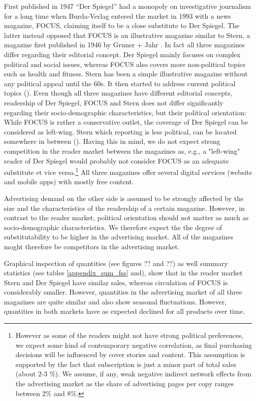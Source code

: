 \documentclass[12pt,a4paper]{scrreprt}
\begin{document}
First published in 1947 ``Der Spiegel'' had a monopoly on investigative journalism for a long time when Burda-Verlag entered the market in 1993 with a news magazine, FOCUS, claiming itself to be a close substitute to Der Spiegel. The latter instead opposed that FOCUS is an illustrative magazine similar to Stern, a magazine first published in 1946 by Gruner + Jahr \cite{kaltenhaeuser_abstimmung_2005}. In fact all three magazines differ regarding their editorial concept. Der Spiegel mainly focuses on complex political and social issues, whereas FOCUS also covers more non-political topics such as health and fitness. Stern has been a simple illustrative magazine without any political appeal until the 60s. It then started to address current political topics (\cite{vogel_populaere_1998}). Even though all three magazines have different editorial concepts, readership of Der Spiegel, FOCUS and Stern does not differ significantly regarding their socio-demographic characteristics, but their political orientation: While FOCUS is rather a conservative outlet, the coverage of Der Spiegel can be considered as left-wing. Stern which reporting is less political, can be located somewhere in between (\cite{kaltenhaeuser_abstimmung_2005}). Having this in mind, we do not expect strong competition in the reader market between the magazines as, e.g., a "left-wing" reader of Der Spiegel would probably not consider FOCUS as an adequate substitute et vice versa.\footnote{However as some of the readers might not have strong political preferences, we expect some kind of contemporary negative correlation, as final purchasing decisions will be influenced by cover stories and content. This assumption is supported by the fact that subscription is just a minor part of total sales (about 2-3 $\%$). We assume, if any, weak negative indirect network effects from the advertising market as the share of advertising pages per copy ranges between 2$\%$ and 8$\%$.} All three magazines offer several digital services (website and mobile apps) with mostly free content. 

Advertising demand on the other side is assumed to be strongly affected by the size and the characteristics of the readership of a certain magazine. However, in contrast to the reader market, political orientation should not matter as much as socio-demographic characteristics. We therefore expect the the degree of substitutability to be higher in the advertising market. All of the magazines moght therefore be competitors in the advertising market.  

Graphical inspection of quantities (see figures ?? and ??) as well summary statistics (see tables \ref{appendix_sum_fss} and), show that in the reader market Stern and Der Spiegel have similar sales, whereas circulation of FOCUS is considerably smaller. However, quantities in the advertising market of all three magazines are quite similar and also show seasonal fluctuations. However, quantities in both markets have as expected declined for all products over time.  
\end{document}
